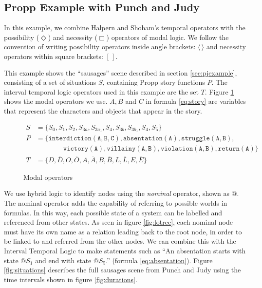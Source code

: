\documentclass{llncs}
\begin{document}
\subsection{Propp Example with Punch and Judy}

In this example, we combine Halpern and Shoham's temporal operators with the possibility ($\Diamond$) and necessity ($\Box$) operators of modal logic. We follow the convention of writing possibility operators inside angle brackets: $\langle \, \rangle$ and necessity operators within square brackets: $[ \, ]$.

This example shows the ``sausages'' scene described in section \ref{sec:pjexample}, consisting of a set of situations $S$, containing Propp story functions $P$. The interval temporal logic operators used in this example are the set $T$. Figure \ref{fig:operators} shows the modal operators we use. $A, B$ and $C$ in formula \ref{eq:story} are variables that represent the characters and objects that appear in the story.

\begin{figure}
\begin{align}
    S &= \{S_0, S_1, S_2, S_{3a}, S_{3a_1}, S_4, S_{3b}, S_{3b_1}, S_4, S_5\}\\
    P &= \{\mathtt{interdiction(A, B, C), absentation(A), struggle(A, B),}\nonumber\\
  &\qquad\qquad\mathtt{victory(A), villainy(A, B), violation(A, B), return(A)}\}\label{eq:story}\\
  T &= \{D, \overline{D}, O, \overline{O}, A, \overline{A}, B, \overline{B}, L, \overline{L}, E, \overline{E}\}
\end{align}
\caption{Modal operators}\label{fig:operators}
\end{figure}

We use hybrid logic to identify nodes using the \emph{nominal} operator, shown as $@$. The nominal operator adds the capability of referring to possible worlds in formulas. In this way, each possible state of a system can be labelled and referenced from other states. As seen in figure \ref{fig:lotrec}, each nominal node must have its own name as a relation leading back to the root node, in order to be linked to and referred from the other nodes.
We can combine this with the Interval Temporal Logic to make statements such as ``An absentation starts with state $@S_1$ and end with state $@S_5$.'' (formula \ref{eq:absentation}).
Figure \ref{fig:situations} describes the full sausages scene from Punch and Judy using the time intervals shown in figure \ref{fig:durations}.
\end{document}

